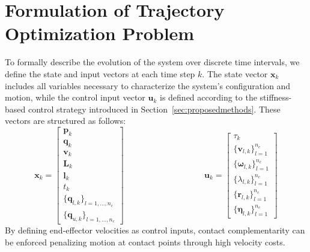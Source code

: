 \documentclass[main.tex]{subfiles}
\begin{document}
\begin{sloppypar}
\section{Formulation of Trajectory Optimization Problem}
\label{sec:formulation}
To formally describe the evolution of the system over discrete time intervals, we define the state and input vectors at each time step \( k \). The state vector \( \mathbf{x}_k \) includes all variables necessary to characterize the system’s configuration and motion, while the control input vector \( \mathbf{u}_k \) is defined according to the stiffness-based control strategy introduced in Section~\ref{sec:proposedmethods}. These vectors are structured as follows:
\begin{equation}
\mathbf{x}_k =
\begin{bmatrix}
\mathbf{p}_k \\
\mathbf{q}_k \\
\mathbf{v}_k \\
\mathbf{L}_k \\
\mathbf{l}_k \\
t_k \\
\{\mathbf{q}_{l,k}\}_{l=1,\ldots,n_c} \\
\{\mathbf{q}_{u,k}\}_{l=1,\ldots,n_c}
\end{bmatrix}
\hspace{4cm}
\mathbf{u}_k =
\begin{bmatrix}
\tau_k \\
\{\mathbf{v}_{l,k}\}_{l=1}^{n_c} \\
\{\boldsymbol{\omega}_{l,k}\}_{l=1}^{n_c} \\
\{\lambda_{l,k}\}_{l=1}^{n_c} \\
\{\mathbf{r}_{l,k}\}_{l=1}^{n_c} \\
\{\boldsymbol{\eta}_{l,k}\}_{l=1}^{n_c}
\end{bmatrix}
\end{equation}
By defining end-effector velocities as control inputs, contact complementarity can be enforced penalizing motion at contact points through high velocity costs.

\end{sloppypar}
\end{document}
